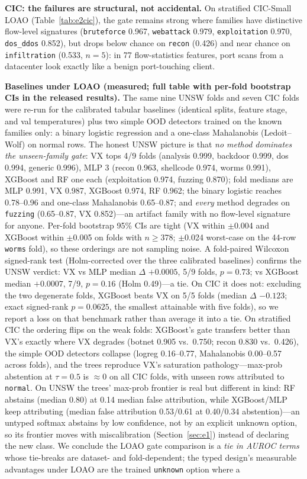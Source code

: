\documentclass[sigconf,anonymous=false]{acmart}
\begin{document}
\textbf{CIC: the failures are structural, not accidental.} On stratified CIC-Small LOAO (Table~\ref{tab:e2cic}), the gate remains strong where families have distinctive flow-level signatures (\texttt{bruteforce} 0.967, \texttt{webattack} 0.979, \texttt{exploitation} 0.970, \texttt{dos\_ddos} 0.852), but drops below chance on \texttt{recon} (0.426) and near chance on \texttt{infiltration} (0.533, $n=5$): in 77 flow-statistics features, port scans from a datacenter look exactly like a benign port-touching client.

\textbf{Baselines under LOAO (measured; full table with per-fold bootstrap CIs in the released results).} The same nine UNSW folds and seven CIC folds were re-run for the calibrated tabular baselines (identical splits, feature stage, and val temperatures) plus two simple OOD detectors trained on the known families only: a binary logistic regression and a one-class Mahalanobis (Ledoit--Wolf) on normal rows. The honest UNSW picture is that \emph{no method dominates the unseen-family gate}: VX tops 4/9 folds (analysis 0.999, backdoor 0.999, dos 0.994, generic 0.996), MLP 3 (recon 0.963, shellcode 0.974, worms 0.991), XGBoost and RF one each (exploitation 0.974, fuzzing 0.870); fold medians are MLP 0.991, VX 0.987, XGBoost 0.974, RF 0.962; the binary logistic reaches 0.78--0.96 and one-class Mahalanobis 0.65--0.87; and \emph{every} method degrades on \texttt{fuzzing} (0.65--0.87, VX 0.852)---an artifact family with no flow-level signature for anyone. Per-fold bootstrap 95\% CIs are tight (VX within $\pm$0.004 and XGBoost within $\pm$0.005 on folds with $n\ge$378; $\pm$0.024 worst-case on the 44-row \texttt{worms} fold), so these orderings are not sampling noise. A fold-paired Wilcoxon signed-rank test (Holm-corrected over the three calibrated baselines) confirms the UNSW verdict: VX vs MLP median $\Delta$ $+0.0005$, 5/9 folds, $p{=}0.73$; vs XGBoost median $+0.0007$, 7/9, $p{=}0.16$ (Holm 0.49)---a tie. On CIC it does not: excluding the two degenerate folds, XGBoost beats VX on 5/5 folds (median $\Delta$ $-0.123$; exact signed-rank $p{=}0.0625$, the smallest attainable with five folds), so we report a loss on that benchmark rather than average it into a tie. On stratified CIC the ordering flips on the weak folds: XGBoost's gate transfers better than VX's exactly where VX degrades (botnet 0.905 vs.\ 0.750; recon 0.830 vs.\ 0.426), the simple OOD detectors collapse (logreg 0.16--0.77, Mahalanobis 0.00--0.57 across folds), and the trees reproduce VX's saturation pathology---max-prob abstention at $\tau{=}0.5$ is $\approx$0 on all CIC folds, with unseen rows attributed to \texttt{normal}. On UNSW the trees' max-prob frontier is real but different in kind: RF abstains (median 0.80) at 0.14 median false attribution, while XGBoost/MLP keep attributing (median false attribution 0.53/0.61 at 0.40/0.34 abstention)---an untyped softmax abstains by low confidence, not by an explicit unknown option, so its frontier moves with miscalibration (Section~\ref{sec:e1}) instead of declaring the new class. We conclude the LOAO gate comparison is a \emph{tie in AUROC terms} whose tie-breaks are dataset- and fold-dependent; the typed design's measurable advantages under LOAO are the trained \texttt{unknown} option where a 
\end{document}
